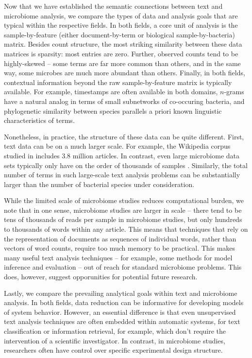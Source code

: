 \documentclass[oupdraft]{bio}
\begin{document}
Now that we have established the semantic connections between text and
microbiome analysis, we compare the types of data and analysis goals that are
typical within the respective fields. In both fields, a core unit of analysis is
the sample-by-feature (either document-by-term or biological sample-by-bacteria)
matrix. Besides count structure, the most striking similarity between these data
matrices is sparsity: most entries are zero. Further, observed counts tend to be
highly-skewed -- some terms are far more common than others, and in the same
way, some microbes are much more abundant than others. Finally, in both fields,
contextual information beyond the raw sample-by-feature matrix is typically
available. For example, timestamps are often available in both domains,
$n$-grams have a natural analog in terms of small subnetworks of co-occuring
bacteria, and phylogenetic similarity between species parallels a priori known
linguistic characteristics of terms.

Nonetheless, in practice, the structure of these data can be quite different.
First, text data can be on a much larger scale. For example, the Wikipedia
corpus studied in \citep{hoffman2013stochastic} includes 3.8 million articles.
In contrast, even large microbiome data sets typically only have on the order of
thousands of samples \citep{human2012structure}. Similarly, the total number of
terms in such large-scale text analysis problems can be substantially larger
than the number of bacterial species under consideration.

While the limited scale of microbiome studies reduces computational burden, we
note that in one sense, microbiome studies are larger in scale -- there tend to
be tens of thousands of reads per sample in microbiome studies, but only
hundreds to thousands of words within any article. This means that techniques
that rely on the representation of documents as sequences of individual words,
rather than vectors of word counts, require too much memory to be practical.
This makes many useful text analysis techniques -- for example, some methods for
model inference \citep{griffiths2004finding} and evaluation
\citep{wallach2009evaluation} -- out of reach for standard microbiome problems.
This does, however, suggest opporunities for potential future research.

Lastly, we compare the prevailing analytical goals within text and microbiome
analysis. In both fields, data reduction can be informative for developing
models of system behavior. However, an essential difference is that even
unsupervised text analysis techniques are often embedded within automatic
systems, for text classification or information retrieval, for example, which
don't require the intervention of a scientific investigator. In contrast,
in microbiome studies, researchers often have control over specific experimental
design structure.
\end{document}
